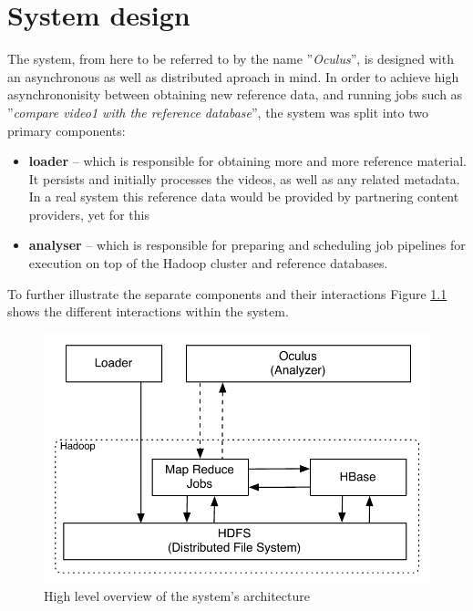 
\chapter{System design}
\label{chap:system-design}

The system, from here to be referred to by the name ''\textit{Oculus}'', is designed with an asynchronous as well as distributed aproach in mind. In order to achieve high asynchrononisity between obtaining new reference data, and running jobs such as ''\textit{compare video1 with the reference database}'', the system was split into two primary components: 

\begin{itemize}
  \item \textbf{loader} -- which is responsible for obtaining more and more reference material. It persists and initially processes the videos, as well as any related metadata. In a real system this reference data would be provided by partnering content providers, yet for this 
  \item \textbf{analyser} -- which is responsible for preparing and scheduling job pipelines for execution on top of the Hadoop cluster and reference databases.
\end{itemize}

To further illustrate the separate components and their interactions Figure \ref{fig:system-overview} shows the different interactions within the system.

\begin{figure}[hc!]
 \centering
  \includegraphics[scale=0.9]{./diagrams/high-level-system.pdf}
  \caption{High level overview of the system's architecture}
  \label{fig:system-overview}
\end{figure}

